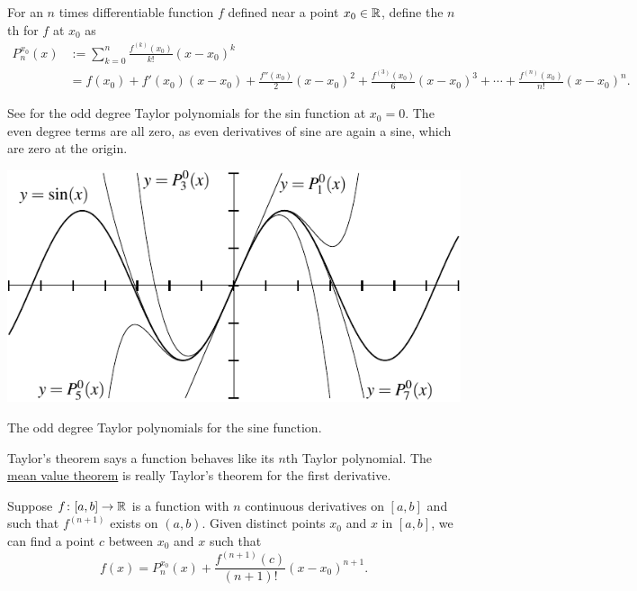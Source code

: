 \begin{defn}
For an $n$ times differentiable function $f$ defined near a point $x_0 \in {\mathbb{R}}$, define the
$n$th \emph{}%
for $f$ at $x_0$ as
\begin{equation*}
\begin{split}
P_n^{x_0}(x)
& :=
\sum_{k=0}^n
\frac{f^{(k)}(x_0)}{k!}{(x-x_0)}^k
\\
& =
f(x_0)
+ f'(x_0)(x-x_0)
+ \frac{f''(x_0)}{2}{(x-x_0)}^2
+ \frac{f^{(3)}(x_0)}{6}{(x-x_0)}^3
+ \cdots
+ \frac{f^{(n)}(x_0)}{n!}{(x-x_0)}^n .
\end{split}
\end{equation*}
\end{defn}

See  for
the odd degree Taylor polynomials for the sin function at $x_0=0$.
The even degree terms are all zero, as even derivatives 
of sine are again a sine, which are zero at the origin.
\begin{myfigureht}
\includegraphics{figures/taylorsin}
\caption{The odd degree Taylor polynomials for the sine
function.\label{fig:taylorsin}}
\end{myfigureht}

Taylor's theorem says a function behaves like its $n$th
Taylor polynomial.  The 
\hyperref[thm:mvt]{mean value theorem} is really Taylor's theorem
for the first derivative.

\begin{thm}[Taylor] \label{thm:taylor}
Suppose $f \colon [a,b] \to {\mathbb{R}}$ is a function with $n$ continuous
derivatives on $[a,b]$ and such that $f^{(n+1)}$ exists on $(a,b)$.
Given distinct points $x_0$ and $x$ in $[a,b]$,
we can find a point $c$ between $x_0$
and $x$ such that
\begin{equation*}
f(x)=P_{n}^{x_0}(x)+\frac{f^{(n+1)}(c)}{(n+1)!}{(x-x_0)}^{n+1} .
\end{equation*}
\end{thm}

